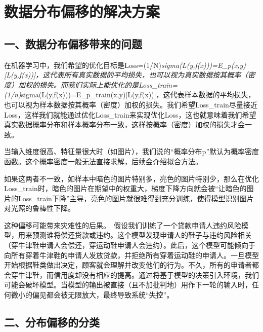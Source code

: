 \clearpage

\hypertarget{ux6570ux636eux5206ux5e03ux504fux79fbux7684ux89e3ux51b3ux65b9ux6848}{%
\section{数据分布偏移的解决方案}\label{ux6570ux636eux5206ux5e03ux504fux79fbux7684ux89e3ux51b3ux65b9ux6848}}

\hypertarget{ux4e00ux6570ux636eux5206ux5e03ux504fux79fbux5e26ux6765ux7684ux95eeux9898}{%
\subsection{一、数据分布偏移带来的问题}\label{ux4e00ux6570ux636eux5206ux5e03ux504fux79fbux5e26ux6765ux7684ux95eeux9898}}

在机器学习中，我们希望的优化目标是Loss=(1/N)\emph{sigma(L(y,f(x)))=E\_p(x,y){[}L(y,f(x)){]}，这代表所有真实数据的平均损失，也可以视为真实数据按其概率（密度）加权的损失。而我们实际上能优化的是Loss\_train=(1/n)}sigma(L(y,f(x)))=E\_p\_train(x,y){[}L(y,f(x)){]}，这代表样本数据的平均损失，也可以视为样本数据按其概率（密度）加权的损失。我们希望Loss\_train尽量接近Loss，这样我们就能通过优化Loss\_train来实现优化Loss，这也就意味着我们希望真实数据概率分布和样本概率分布一致，这样按概率（密度）加权的损失才会一致。

当输入维度很高、特征量很大时（如图片），我们说的``概率分布p''默认为概率密度函数。这个概率密度一般无法直接求解，后续会介绍拟合方法。

如果这两者不一致，如样本中暗色的图片特别多，亮色的图片特别少，那么在优化Loss\_train时，暗色的图片在期望中的权重大，梯度下降方向就会被``让暗色的图片的Loss\_train下降''主导，亮色的图片就很难得到充分训练，使得模型识别图片对光照的鲁棒性下降。

这种偏移可能带来灾难性的后果。~假设我们训练了一个贷款申请人违约风险模型，用来预测谁将偿还贷款或违约。这个模型发现申请人的鞋子与违约风险相关（穿牛津鞋申请人会偿还，穿运动鞋申请人会违约）。此后，这个模型可能倾向于向所有穿着牛津鞋的申请人发放贷款，并拒绝所有穿着运动鞋的申请人。一旦模型开始根据鞋类做出决定，顾客就会理解并改变他们的行为。不久，所有的申请者都会穿牛津鞋，而信用度却没有相应的提高。通过将基于模型的决策引入环境，我们可能会破坏模型。当模型的输出被直接（且不加批判地）用作下一轮的输入时，任何微小的偏见都会被无限放大，最终导致系统``失控''。

\hypertarget{ux4e8cux5206ux5e03ux504fux79fbux7684ux5206ux7c7b}{%
\subsection{二、分布偏移的分类}\label{ux4e8cux5206ux5e03ux504fux79fbux7684ux5206ux7c7b}}

